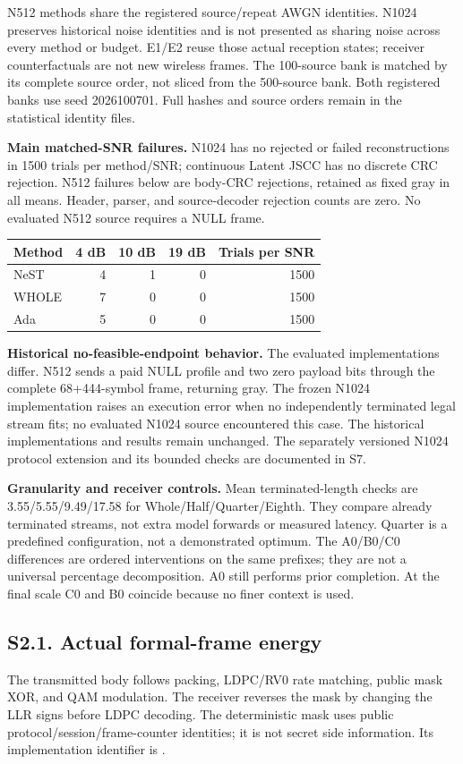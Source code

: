 \documentclass[11pt,letterpaper]{article}
\begin{document}
N512 methods share the registered source/repeat AWGN identities. N1024 preserves historical noise identities and is not presented as sharing noise across every method or budget. E1/E2 reuse those actual reception states; receiver counterfactuals are not new wireless frames. The 100-source bank is matched by its complete source order, not sliced from the 500-source bank. Both registered banks use seed 2026100701. Full hashes and source orders remain in the statistical identity files.

\textbf{Main matched-SNR failures.} N1024 has no rejected or failed reconstructions in 1500 trials per method/SNR; continuous Latent JSCC has no discrete CRC rejection. N512 failures below are body-CRC rejections, retained as fixed gray in all means. Header, parser, and source-decoder rejection counts are zero. No evaluated N512 source requires a NULL frame.
\begin{center}\begin{tabular}{lrrrr}\toprule
Method & 4 dB & 10 dB & 19 dB & Trials per SNR\\\midrule
NeST & 4 & 1 & 0 & 1500\\
WHOLE & 7 & 0 & 0 & 1500\\
Ada & 5 & 0 & 0 & 1500\\\bottomrule
\end{tabular}\end{center}
\textbf{Historical no-feasible-endpoint behavior.} The evaluated implementations differ. N512 sends a paid NULL profile and two zero payload bits through the complete 68+444-symbol frame, returning gray. The frozen N1024 implementation raises an execution error when no independently terminated legal stream fits; no evaluated N1024 source encountered this case. The historical implementations and results remain unchanged. The separately versioned N1024 protocol extension and its bounded checks are documented in S7.

\textbf{Granularity and receiver controls.} Mean terminated-length checks are 3.55/5.55/9.49/17.58 for Whole/Half/Quarter/Eighth. They compare already terminated streams, not extra model forwards or measured latency. Quarter is a predefined configuration, not a demonstrated optimum. The A0/B0/C0 differences are ordered interventions on the same prefixes; they are not a universal percentage decomposition. A0 still performs prior completion. At the final scale C0 and B0 coincide because no finer context is used.


\clearpage\subsection*{S2.1. Actual formal-frame energy}
The transmitted body follows packing, LDPC/RV0 rate matching, public mask XOR, and QAM modulation. The receiver reverses the mask by changing the LLR signs before LDPC decoding. The deterministic mask uses public protocol/session/frame-counter identities; it is not secret side information. Its implementation identifier is
.
\end{document}
